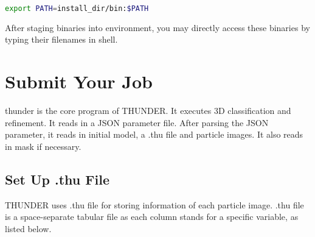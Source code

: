 \documentclass{article}
\begin{document}
                \begin{lstlisting}[language={bash}]
export PATH=install_dir/bin:$PATH
                \end{lstlisting}
                
                After staging binaries into environment, you may directly access these binaries by typing their filenames in shell.
                
    \section{Submit Your Job}
    
        \textsf{thunder} is the core program of THUNDER. It executes 3D classification and refinement. It reads in a JSON parameter file. After parsing the JSON parameter, it reads in initial model, a \textsf{.thu} file and particle images. It also reads in mask if necessary.
              
        \subsection{Set Up \textsf{.thu} File}
        
            THUNDER uses \textsf{.thu} file for storing information of each particle image. \textsf{.thu} file is a space-separate tabular file as each column stands for a specific variable, as listed below.
            
\end{document}
